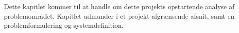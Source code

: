 Dette kapitlet kommer til at handle om dette projekts opstartende analyse af problemområdet. Kapitlet udmunder i et projekt afgrænsende afsnit, samt en problemformulering og systemdefinition.